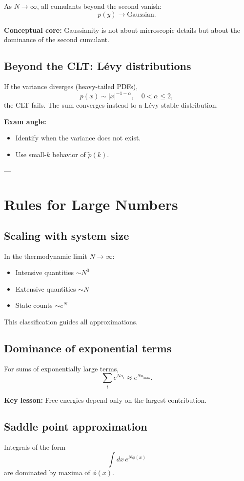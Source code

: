 \documentclass[9pt,twocoloumn]{article}
\begin{document}
As $N\to\infty$, all cumulants beyond the second vanish:
\[
p(y) \to \text{Gaussian}.
\]

\textbf{Conceptual core:} Gaussianity is not about microscopic details but about the dominance of the second cumulant.

\subsection*{Beyond the CLT: Lévy distributions}
If the variance diverges (heavy-tailed PDFs),
\[
p(x) \sim |x|^{-1-\alpha}, \quad 0<\alpha\le2,
\]
the CLT fails. The sum converges instead to a Lévy stable distribution.

\textbf{Exam angle:}
\begin{itemize}
\item Identify when the variance does not exist.
\item Use small-$k$ behavior of $\tilde p(k)$.
\end{itemize}

---

\section{Rules for Large Numbers}

\subsection*{Scaling with system size}
In the thermodynamic limit $N\to\infty$:
\begin{itemize}
\item Intensive quantities $\sim N^0$
\item Extensive quantities $\sim N$
\item State counts $\sim e^{N}$
\end{itemize}

This classification guides all approximations.

\subsection*{Dominance of exponential terms}
For sums of exponentially large terms,
\[
\sum_i e^{N a_i} \approx e^{N a_{\max}}.
\]

\textbf{Key lesson:} Free energies depend only on the largest contribution.

\subsection*{Saddle point approximation}
Integrals of the form
\[
\int dx \, e^{N\phi(x)}
\]
are dominated by maxima of $\phi(x)$.
\end{document}
